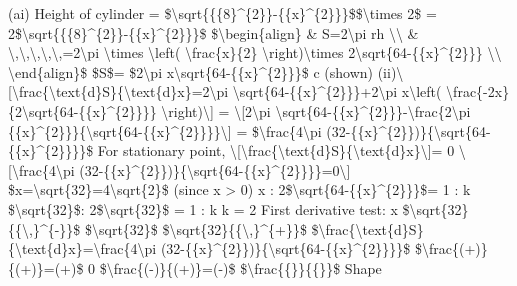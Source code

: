 \item (ai) Height of cylinder = \$\textbackslash sqrt\{\{\{8\}\textasciicircum\{2\}\}-\{\{x\}\textasciicircum\{2\}\}\}\$\$\textbackslash times
2\$ = 2\$\textbackslash sqrt\{\{\{8\}\textasciicircum\{2\}\}-\{\{x\}\textasciicircum\{2\}\}\}\$
\$\textbackslash begin\{align\} \& S=2\textbackslash pi rh \textbackslash\textbackslash{}
\& \textbackslash ,\textbackslash ,\textbackslash ,\textbackslash ,\textbackslash ,=2\textbackslash pi
\textbackslash times \textbackslash left( \textbackslash frac\{x\}\{2\}
\textbackslash right)\textbackslash times 2\textbackslash sqrt\{64-\{\{x\}\textasciicircum\{2\}\}\}
\textbackslash\textbackslash{} \textbackslash end\{align\}\$ \$S\$=
\$2\textbackslash pi x\textbackslash sqrt\{64-\{\{x\}\textasciicircum\{2\}\}\}\$
c (shown) (ii)\textbackslash{[}\textbackslash frac\{\textbackslash text\{d\}S\}\{\textbackslash text\{d\}x\}=2\textbackslash pi
\textbackslash sqrt\{64-\{\{x\}\textasciicircum\{2\}\}\}+2\textbackslash pi
x\textbackslash left( \textbackslash frac\{-2x\}\{2\textbackslash sqrt\{64-\{\{x\}\textasciicircum\{2\}\}\}\}
\textbackslash right)\textbackslash{]} = \textbackslash{[}2\textbackslash pi
\textbackslash sqrt\{64-\{\{x\}\textasciicircum\{2\}\}\}-\textbackslash frac\{2\textbackslash pi
\{\{x\}\textasciicircum\{2\}\}\}\{\textbackslash sqrt\{64-\{\{x\}\textasciicircum\{2\}\}\}\}\textbackslash{]}
= \$\textbackslash frac\{4\textbackslash pi (32-\{\{x\}\textasciicircum\{2\}\})\}\{\textbackslash sqrt\{64-\{\{x\}\textasciicircum\{2\}\}\}\}\$
For stationary point, \textbackslash{[}\textbackslash frac\{\textbackslash text\{d\}S\}\{\textbackslash text\{d\}x\}\textbackslash{]}=
0 \textbackslash{[}\textbackslash frac\{4\textbackslash pi (32-\{\{x\}\textasciicircum\{2\}\})\}\{\textbackslash sqrt\{64-\{\{x\}\textasciicircum\{2\}\}\}\}=0\textbackslash{]}
\$x=\textbackslash sqrt\{32\}=4\textbackslash sqrt\{2\}\$ (since
x > 0) x : 2\$\textbackslash sqrt\{64-\{\{x\}\textasciicircum\{2\}\}\}\$=
1 : k \$\textbackslash sqrt\{32\}\$: 2\$\textbackslash sqrt\{32\}\$
= 1 : k k = 2 First derivative test: x \$\textbackslash sqrt\{32\}\{\{\textbackslash ,\}\textasciicircum\{-\}\}\$
\$\textbackslash sqrt\{32\}\$ \$\textbackslash sqrt\{32\}\{\{\textbackslash ,\}\textasciicircum\{+\}\}\$
\$\textbackslash frac\{\textbackslash text\{d\}S\}\{\textbackslash text\{d\}x\}=\textbackslash frac\{4\textbackslash pi
(32-\{\{x\}\textasciicircum\{2\}\})\}\{\textbackslash sqrt\{64-\{\{x\}\textasciicircum\{2\}\}\}\}\$
\$\textbackslash frac\{(+)\}\{(+)\}=(+)\$ 0 \$\textbackslash frac\{(-)\}\{(+)\}=(-)\$
\$\textbackslash frac\{\{\}\}\{\{\}\}\$ Shape 

